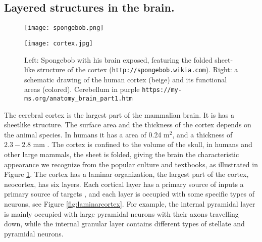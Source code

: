 \documentclass{article}
\begin{document}
\subsection{Layered structures in the brain.}\label{Layered structures}
\begin{figure}[!tbp]
  \centering
  \begin{minipage}[b]{0.4\textwidth}
    \texttt{[image: spongebob.png]}
  \end{minipage}
  \begin{minipage}[b]{0.5\textwidth}
    \texttt{[image: cortex.jpg]}
  \end{minipage}  
   \caption{Left: Spongebob with his brain exposed, featuring the folded sheet-like structure of the cortex (\texttt{http://spongebob.wikia.com}). Right: a schematic drawing of the human cortex (beige) and its functional areas (colored). Cerebellum in purple \texttt{https://my-ms.org/anatomy\_brain\_part1.htm}}
  \label{fig:spongebob}
\end{figure}

The cerebral cortex is the largest part of the mammalian brain. It is has a sheetlike structure. The surface area and the thickness of the cortex depends on the animal species. In humans it has a area of 0.24 m$^2$, and a thickness of $2.3 - 2.8$ mm \cite{wikipedia}. The cortex is confined to the volume of the skull, in humans and other large mammals, the sheet is folded, giving the brain the characteristic appearance we recognize from the popular culture and textbooks, as illustrated in Figure  \ref{fig:spongebob}.  The cortex has a laminar organization, the largest part of the cortex, neocortex, has six layers. Each cortical layer has a primary source of inputs a primary source of targets \cite{Neuroscience}, and each layer is occupied with some specific types of neurons, see Figure \ref{fig:laminarcortex}. For example, the internal pyramidal layer is mainly occupied with large pyramidal neurons with their axons travelling down, while the  internal granular layer contains different types of stellate and pyramidal neurons. 
\end{document}
